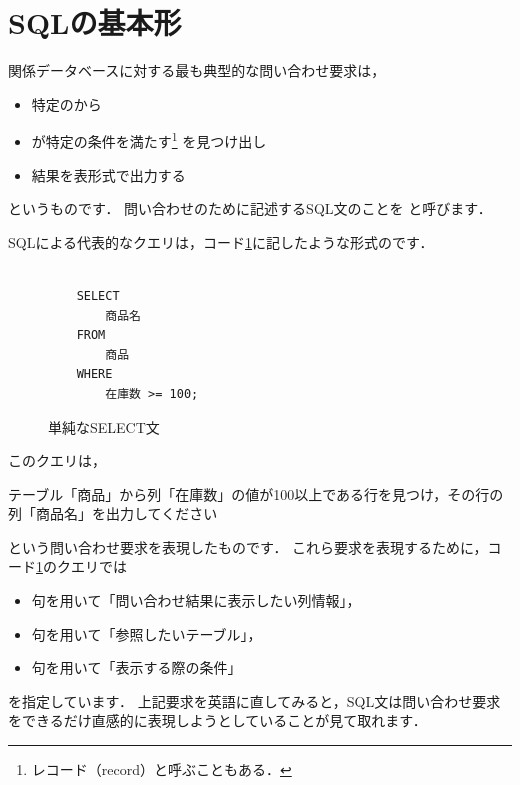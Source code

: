 \section{SQLの基本形}
関係データベースに対する最も典型的な問い合わせ要求は，
\begin{itemize}
\item 特定のから
\item {} が特定の条件を満たす\footnote{レコード（record）と呼ぶこともある．} を見つけ出し
\item 結果を表形式で出力する
\end{itemize}
というものです．
問い合わせのために記述するSQL文のことを と呼びます．

SQLによる代表的なクエリは，コード\ref{code:first-sql}に記したような形式のです．
\begin{figure}[!htbp]
    \begin{verbatim}

    SELECT
        商品名
    FROM
        商品
    WHERE
        在庫数 >= 100;

    \end{verbatim}
    \captionsetup{name=コード}
    \caption{単純なSELECT文}
    \label{code:first-sql}
\end{figure}
このクエリは，
\begin{framed}
テーブル「商品」から列「在庫数」の値が100以上である行を見つけ，その行の列「商品名」を出力してください
\end{framed}
という問い合わせ要求を表現したものです．
これら要求を表現するために，コード\ref{code:first-sql}のクエリでは
\begin{itemize}
\item {}句を用いて「問い合わせ結果に表示したい列情報」，
\item {}句を用いて「参照したいテーブル」，
\item {}句を用いて「表示する際の条件」
\end{itemize}
を指定しています．
上記要求を英語に直してみると，SQL文は問い合わせ要求をできるだけ直感的に表現しようとしていることが見て取れます．

